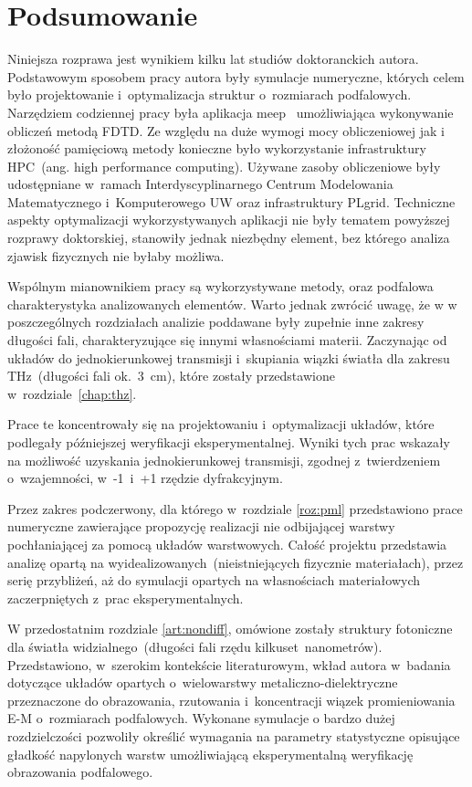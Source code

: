 \chapter{Podsumowanie}
Niniejsza rozprawa jest wynikiem kilku lat studiów doktoranckich autora. Podstawowym sposobem pracy autora były symulacje numeryczne, których celem było projektowanie i~optymalizacja struktur o~rozmiarach podfalowych. Narzędziem codziennej pracy była aplikacja meep~\cite{OskooiRo10} umożliwiająca wykonywanie obliczeń metodą FDTD. Ze względu na duże wymogi mocy obliczeniowej jak i złożoność pamięciową metody konieczne było wykorzystanie infrastruktury HPC~(ang. high performance computing). Używane zasoby obliczeniowe były udostępniane w~ramach Interdyscyplinarnego Centrum Modelowania Matematycznego i~Komputerowego UW oraz infrastruktury PLgrid. Techniczne aspekty optymalizacji wykorzystywanych aplikacji nie były tematem powyższej rozprawy doktorskiej, stanowiły jednak niezbędny element, bez którego analiza zjawisk fizycznych nie byłaby możliwa.

Wspólnym mianownikiem pracy są wykorzystywane metody, oraz podfalowa charakterystyka analizowanych elementów. Warto jednak zwrócić uwagę, że w w poszczególnych rozdziałach analizie poddawane były zupełnie inne zakresy długości fali, charakteryzujące się innymi własnościami materii. Zaczynając od układów do jednokierunkowej transmisji i~skupiania wiązki światła dla zakresu THz~(długości fali ok.~3~cm), które zostały przedstawione w~rozdziale~\ref{chap:thz}. 

Prace te koncentrowały się na projektowaniu i~optymalizacji układów, które podlegały późniejszej weryfikacji eksperymentalnej. Wyniki tych prac wskazały na możliwość uzyskania jednokierunkowej transmisji, zgodnej z~twierdzeniem o~wzajemności, w~-1~i~+1 rzędzie dyfrakcyjnym. 

Przez zakres podczerwony, dla którego w~rozdziale \ref{roz:pml} przedstawiono prace numeryczne zawierające propozycję realizacji nie odbijającej warstwy pochłaniającej za pomocą układów warstwowych. Całość projektu przedstawia analizę opartą na wyidealizowanych~(nieistniejących fizycznie materiałach), przez serię przybliżeń, aż do symulacji opartych na własnościach materiałowych zaczerpniętych z~prac eksperymentalnych.

W przedostatnim  rozdziale \ref{art:nondiff},  omówione zostały struktury fotoniczne dla światła widzialnego~(długości fali rzędu kilkuset~nanometrów). Przedstawiono, w~szerokim kontekście literaturowym, wkład autora w~badania dotyczące układów opartych o~wielowarstwy metaliczno-dielektryczne przeznaczone do obrazowania, rzutowania i~koncentracji wiązek promieniowania E-M o~rozmiarach podfalowych. Wykonane symulacje o bardzo dużej rozdzielczości pozwoliły określić wymagania na parametry statystyczne opisujące gładkość napylonych warstw umożliwiającą eksperymentalną weryfikację obrazowania podfalowego.

